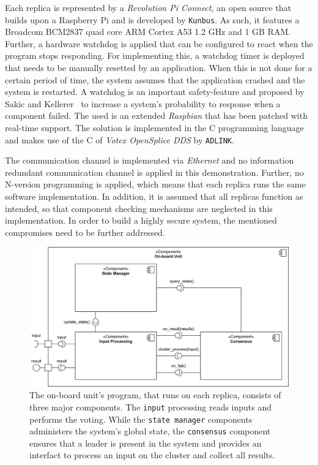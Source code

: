 Each replica is represented by a \textit{Revolution Pi Connect}, an open source  that builds upon a Raspberry Pi and is developed by \texttt{Kunbus}.
As such, it features a Broadcom BCM2837 quad core ARM Cortex A53 1.2 GHz  and 1 GB RAM.
Further, a hardware watchdog is applied that can be configured to react when the program stops responding.
For implementing this, a watchdog timer is deployed that needs to be manually resetted by an application.
When this is not done for a certain period of time, the system assumes that the application crashed and the system is restarted.
A watchdog is an important safety-feature and proposed by Sakic and Kellerer~\cite{SakicTimeInConsensus} to increase a system's probability to response when a component failed.
The used  is an extended \textit{Raspbian}  that has been patched with real-time support.
The solution is implemented in the C programming language and makes use of the C  of \textit{Votex OpenSplice DDS} by \texttt{ADLINK}.

The communication channel is implemented via \textit{Ethernet} and no information redundant communication channel is applied in this demonstration.
Further, no N-version programming is applied, which means that each replica runs the same software implementation.
In addition, it is assumed that all replicas function as intended, so that component checking mechanisms are neglected in this implementation.
In order to build a highly secure system, the mentioned compromises need to be further addressed.

\begin{figure}[!hb]
	\centering
	\includegraphics[width=0.9\linewidth]{images/Components}
	\caption{The on-board unit's program, that runs on each replica, consists of three major components. The \texttt{input} processing reads inputs and performs the voting. While the \texttt{state manager} components administers the system's global state, the \texttt{consensus} component ensures that a leader is present in the system and provides an interfact to process an input on the cluster and collect all results.}
	\label{fig:SystemComponents}
\end{figure}

